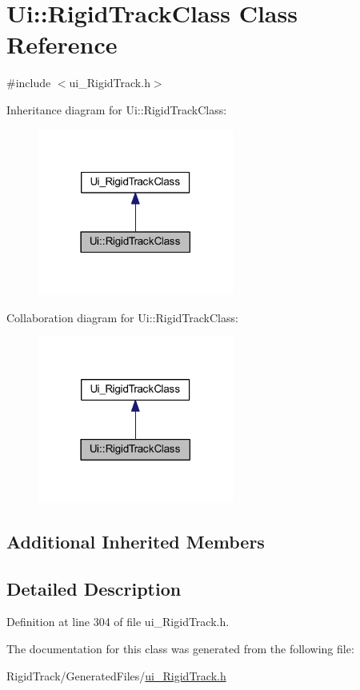 \hypertarget{class_ui_1_1_rigid_track_class}{}\section{Ui\+:\+:Rigid\+Track\+Class Class Reference}
\label{class_ui_1_1_rigid_track_class}


{\ttfamily \#include $<$ui\+\_\+\+Rigid\+Track.\+h$>$}



Inheritance diagram for Ui\+:\+:Rigid\+Track\+Class\+:\nopagebreak
\begin{figure}[H]
\begin{center}
\leavevmode
\includegraphics[width=182pt]{class_ui_1_1_rigid_track_class__inherit__graph}
\end{center}
\end{figure}


Collaboration diagram for Ui\+:\+:Rigid\+Track\+Class\+:\nopagebreak
\begin{figure}[H]
\begin{center}
\leavevmode
\includegraphics[width=182pt]{class_ui_1_1_rigid_track_class__coll__graph}
\end{center}
\end{figure}
\subsection*{Additional Inherited Members}


\subsection{Detailed Description}


Definition at line 304 of file ui\+\_\+\+Rigid\+Track.\+h.



The documentation for this class was generated from the following file\+:\begin{DoxyCompactItemize}
\item 
Rigid\+Track/\+Generated\+Files/\hyperlink{ui___rigid_track_8h}{ui\+\_\+\+Rigid\+Track.\+h}\end{DoxyCompactItemize}

